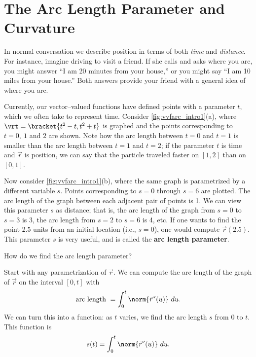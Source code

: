 \section{The Arc Length Parameter and Curvature}\label{sec:curvature}

In normal conversation we describe position in terms of both \emph{time} and \emph{distance}. For instance, imagine driving to visit a friend. If she calls and asks where you are, you might answer ``I am 20 minutes from your house,'' or you might say ``I am 10 miles from your house.'' Both answers provide your friend with a general idea of where you are.

Currently, our vector--valued functions have defined points with a parameter $t$, which we often take to represent time. Consider \autoref{fig:vvfarc_intro1}(a), where $\vrt =\bracket{t^2-t,t^2+t}$ is graphed and the points corresponding to $t=0,\ 1$ and $2$ are shown. Note how the arc length between $t=0$ and $t=1$ is smaller than the arc length between $t=1$ and $t=2$; if the parameter $t$ is time and $\vec r$ is position, we can say that the particle traveled faster on $[1,2]$ than on $[0,1]$. 

Now consider \autoref{fig:vvfarc_intro1}(b), where the same graph is parametrized by a different variable $s$.  Points corresponding to $s=0$ through $s=6$ are plotted. The arc length of the graph between each adjacent pair of points is 1. We can view this parameter $s$ as distance; that is, the arc length of the graph from $s=0$ to $s=3$ is 3, the arc length from $s=2$ to $s=6$ is 4, etc. If one wants to find the point 2.5 units from an initial location (i.e., $s=0$), one would compute $\vec r(2.5)$. This parameter $s$ is very useful, and is called the \textbf{arc length parameter}.

How do we find the arc length parameter? 

Start with any parametrization of $\vec r$. We can compute the arc length of the graph of $\vec r$ on the interval $[0,t]$ with $$\text{arc length } = \int_0^t\norm{\vec r\,'(u)}\ du.$$ We can turn this into a function: as $t$ varies, we find the arc length $s$ from $0$ to $t$. This function is
\begin{equation}
s(t) = \int_0^t \norm{\vec r\,'(u)}\ du.\label{eq:vvfarc}
\end{equation}

